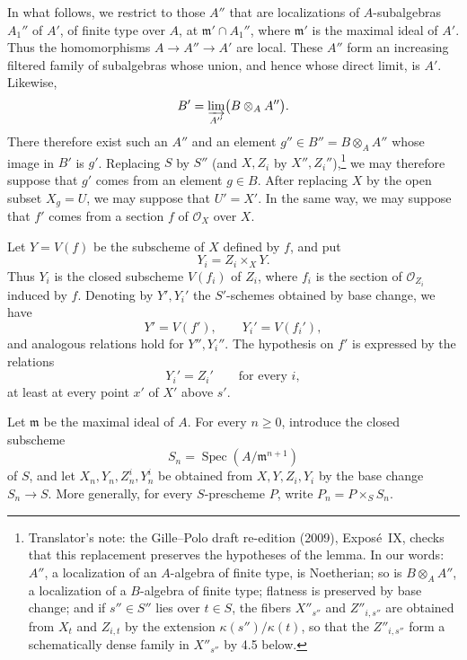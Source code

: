In what follows, we restrict to those \(A''\) that are localizations of
\(A\)-subalgebras \(A_1''\) of \(A'\), of finite type over \(A\), at
\(\mathfrak m'\cap A_1''\), where \(\mathfrak m'\) is the maximal ideal
of \(A'\). Thus the homomorphisms \(A\to A''\to A'\) are local. These
\(A''\) form an increasing filtered family of subalgebras whose union,
and hence whose direct limit, is \(A'\). Likewise,
\[
  B'=\varinjlim_{A''}\bigl(B\otimes_A A''\bigr).
\]
There therefore exist such an \(A''\) and an element
\(g''\in B''=B\otimes_A A''\) whose image in \(B'\) is \(g'\).
Replacing \(S\) by \(S''\) (and \(X,Z_i\) by \(X'',Z_i''\)),\footnote{Translator's
note: the Gille--Polo draft re-edition (2009), Expos\'e~IX, checks that
this replacement preserves the hypotheses of the lemma. In our words:
\(A''\), a localization of an \(A\)-algebra of finite type, is
Noetherian; so is \(B\otimes_AA''\), a localization of a \(B\)-algebra of
finite type; flatness is preserved by base change; and if \(s''\in S''\)
lies over \(t\in S\), the fibers \(X''_{s''}\) and \(Z''_{i,s''}\) are
obtained from \(X_t\) and \(Z_{i,t}\) by the extension
\(\kappa(s'')/\kappa(t)\), so that the \(Z''_{i,s''}\) form a
schematically dense family in \(X''_{s''}\) by 4.5 below.} we may
therefore suppose that \(g'\) comes from an element \(g\in B\).
After replacing \(X\) by the open subset \(X_g=U\), we may suppose that
\(U'=X'\). In the same way, we may suppose that \(f'\) comes from a
section \(f\) of \(\mathscr O_X\) over \(X\).

Let \(Y=V(f)\) be the subscheme of \(X\) defined by \(f\), and put
\[
  Y_i=Z_i\times_XY.
\]
Thus \(Y_i\) is the closed subscheme \(V(f_i)\) of \(Z_i\), where \(f_i\)
is the section of \(\mathscr O_{Z_i}\) induced by \(f\). Denoting by
\(Y',Y_i'\) the \(S'\)-schemes obtained by base change, we have
\[
  Y'=V(f'),
  \qquad
  Y_i'=V(f_i'),
\]
and analogous relations hold for \(Y'',Y_i''\). The hypothesis on
\(f'\) is expressed by the relations
\[
  Y_i'=Z_i'\qquad\text{for every }i,
\]
at least at every point \(x'\) of \(X'\) above \(s'\).

Let \(\mathfrak m\) be the maximal ideal of \(A\). For every
\(n\geq0\), introduce the closed subscheme
\[
  S_n=\operatorname{Spec}(A/\mathfrak m^{n+1})
\]
of \(S\), and let \(X_n,Y_n,Z_n^i,Y_n^i\) be obtained from
\(X,Y,Z_i,Y_i\) by the base change \(S_n\to S\). More generally, for
every \(S\)-prescheme \(P\), write \(P_n=P\times_SS_n\).

